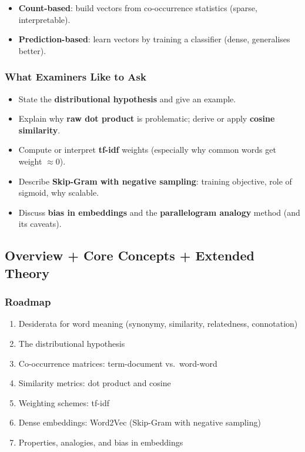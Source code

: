 \begin{itemize}
  \item \textbf{Count-based}: build vectors from co-occurrence statistics (sparse, interpretable).
  \item \textbf{Prediction-based}: learn vectors by training a classifier (dense, generalises better).
\end{itemize}

\separator

\subsubsection*{What Examiners Like to Ask}

\begin{itemize}
  \item State the \textbf{distributional hypothesis} and give an example.
  \item Explain why \textbf{raw dot product} is problematic; derive or apply \textbf{cosine similarity}.
  \item Compute or interpret \textbf{tf-idf} weights (especially why common words get weight $\approx 0$).
  \item Describe \textbf{Skip-Gram with negative sampling}: training objective, role of sigmoid, why scalable.
  \item Discuss \textbf{bias in embeddings} and the \textbf{parallelogram analogy} method (and its caveats).
\end{itemize}

\separator

\subsection{Overview + Core Concepts + Extended Theory}

\subsubsection*{Roadmap}
\begin{enumerate}
  \item Desiderata for word meaning (synonymy, similarity, relatedness, connotation)
  \item The distributional hypothesis
  \item Co-occurrence matrices: term-document vs.\ word-word
  \item Similarity metrics: dot product and cosine
  \item Weighting schemes: tf-idf
  \item Dense embeddings: Word2Vec (Skip-Gram with negative sampling)
  \item Properties, analogies, and bias in embeddings
\end{enumerate}

